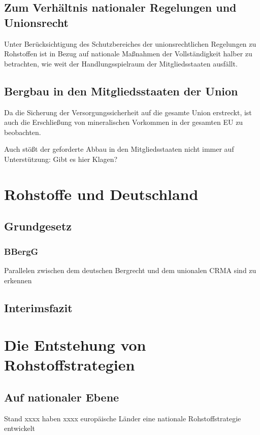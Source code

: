 \documentclass[12pt,a4paper,oneside]{book} %
\begin{document}
	\subsection{Zum Verhältnis nationaler Regelungen und Unionsrecht}
	Unter Berücksichtigung des Schutzbereiches der unionsrechtlichen Regelungen zu Rohstoffen ist in Bezug auf nationale Maßnahmen der Vollständigkeit halber zu betrachten, wie weit der Handlungsspielraum der Mitgliedsstaaten ausfällt.
	
	\subsection{Bergbau in den Mitgliedsstaaten der Union}
	
Da die Sicherung der Versorgungssicherheit auf die gesamte Union erstreckt, ist auch die Erschließung von mineralischen Vorkommen in der gesamten EU zu beobachten.	


Auch stößt der geforderte Abbau in den Mitgliedsstaaten nicht immer auf Unterstützung: Gibt es hier Klagen?
	
	\section{Rohstoffe und Deutschland}
	
	\subsection{Grundgesetz}
	
	\subsubsection{BBergG}
	Parallelen zwischen dem deutschen Bergrecht und dem unionalen CRMA sind zu erkennen
	
	\subsection{Interimsfazit}
	
	\section{Die Entstehung von Rohstoffstrategien}
	
	\subsection{Auf nationaler Ebene}
	Stand xxxx haben xxxx europäische Länder eine nationale Rohstoffstrategie entwickelt
	
\end{document}
